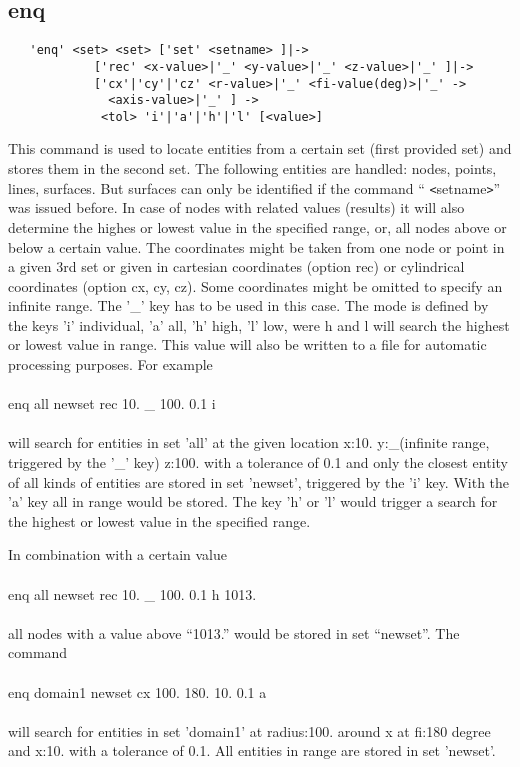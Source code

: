 \documentclass{article}
\begin{document}
\subsection{\label{enq}enq}
\begin{verbatim}
   'enq' <set> <set> ['set' <setname> ]|->
            ['rec' <x-value>|'_' <y-value>|'_' <z-value>|'_' ]|->
            ['cx'|'cy'|'cz' <r-value>|'_' <fi-value(deg)>|'_' ->
              <axis-value>|'_' ] -> 
             <tol> 'i'|'a'|'h'|'l' [<value>]
\end{verbatim}
This command is used to locate entities from a certain set (first provided set) and stores them in the second set. The following entities are handled: nodes, points, lines, surfaces. But surfaces can only be identified if the command `` \verb_<_setname\verb_>_'' was issued before. In case of nodes with related values (results) it will also determine the highes or lowest value in the specified range, or, all nodes above or below a certain value. The coordinates might be taken from one node or point in a given 3rd set or given in cartesian coordinates (option rec) or cylindrical coordinates (option cx, cy, cz). Some coordinates might be omitted to specify an infinite range. The '\_' key has to be used in this case. The mode is defined by the keys 'i' individual, 'a' all, 'h' high, 'l' low, were h and l will search the highest or lowest value in range. This value will also be written to a file for automatic processing purposes. For example\\\\
enq all newset rec 10. \_ 100. 0.1 i\\\\
will search for entities in set 'all' at the given location x:10. y:\_(infinite range, triggered by the '\_' key) z:100. with a tolerance of 0.1 and only the closest entity of all kinds of entities are stored in set 'newset', triggered by the 'i' key. With the 'a' key all in range would be stored. The key 'h' or 'l' would trigger a search for the highest or lowest value in the specified range. 

In combination with a certain value\\\\
enq all newset rec 10. \_ 100. 0.1 h 1013.\\\\all nodes with a value above ``1013.'' would be stored in set ``newset''. The command \\\\
enq domain1 newset cx 100. 180. 10. 0.1 a\\\\
will search for entities in set 'domain1' at radius:100. around x at fi:180 degree and x:10. with a tolerance of 0.1. All entities in range are stored in set 'newset'.
\end{document}
